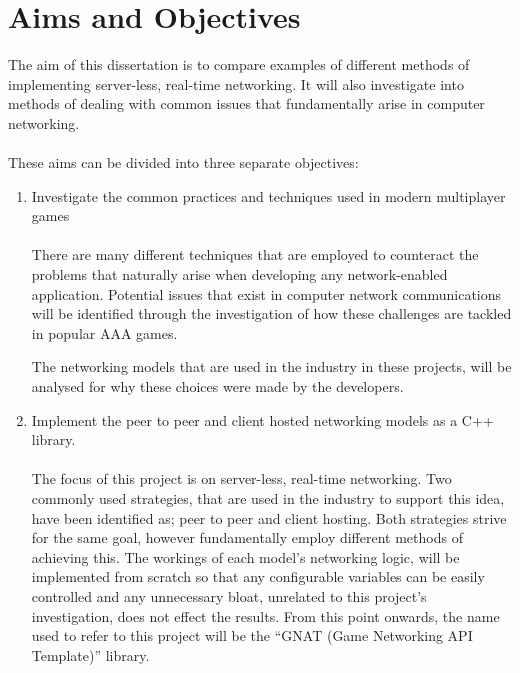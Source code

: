 \section{Aims and Objectives}\label{sec:aims_and_objectives}
The aim of this dissertation is to compare examples of different methods of implementing server-less, real-time networking. It will also investigate into methods of dealing with common issues that fundamentally arise in computer networking.
\\\\
These aims can be divided into three separate objectives:
\begin{enumerate}
\item Investigate the common practices and techniques used in modern multiplayer games
  \\\\
  There are many different techniques that are employed to counteract the problems that naturally arise when developing any network-enabled application. Potential issues that exist in computer network communications will be identified through the investigation of how these challenges are tackled in popular AAA games.

  The networking models that are used in the industry in these projects, will be analysed for why these choices were made by the developers.


\item Implement the peer to peer and client hosted networking models as a C++ library.
  \\\\
  The focus of this project is on server-less, real-time networking. Two commonly used strategies, that are used in the industry to support this idea, have been identified as; peer to peer and client hosting. Both strategies strive for the same goal, however fundamentally employ different methods of achieving this.
  The workings of each model's networking logic, will be implemented from scratch so that any configurable variables can be easily controlled and any unnecessary bloat, unrelated to this project's investigation, does not effect the results.
  From this point onwards, the name used to refer to this project will be the ``GNAT (Game Networking API Template)'' library.


\end{enumerate}

